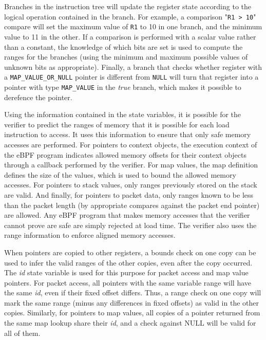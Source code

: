 \documentclass[10pt,sigconf]{acmart}
\begin{document}
Branches in the instruction tree will update the register state according to the
logical operation contained in the branch. For example, a comparison "\texttt{R1
  > 10}" compare will set the maximum value of \texttt{R1} to 10 in one branch,
and the minimum value to 11 in the other. If a comparison is performed with a
scalar value rather than a constant, the knowledge of which bits are set is used
to compute the ranges for the branches (using the minimum and maximum possible
values of unknown bits as appropriate). Finally, a branch that checks whether
register with a \texttt{MAP\_VALUE\_OR\_NULL} pointer is different from
\texttt{NULL} will turn that register into a pointer with type
\texttt{MAP\_VALUE} in the \emph{true} branch, which makes it possible to
derefence the pointer.

Using the information contained in the state variables, it is possible for the
verifier to predict the ranges of memory that it is possible for each load
instruction to access. It uses this information to ensure that only safe memory
accesses are performed. For pointers to context objects, the execution context
of the eBPF program indicates allowed memory offsets for their context objects
through a callback performed by the verifier. For map values, the map definition
defines the size of the values, which is used to bound the allowed memory
accesses. For pointers to stack values, only ranges previously stored on the
stack are valid. And finally, for pointers to packet data, only ranges known to
be less than the packet length (by appropriate compares against the packet end
pointer) are allowed. Any eBPF program that makes memory accesses that the
verifier cannot prove are safe are simply rejected at load time. The verifier
also uses the range information to enforce aligned memory accesses.

When pointers are copied to other registers, a bounds check on one copy can be
used to infer the valid ranges of the other copies, even after the copy
occurred. The \emph{id} state variable is used for this purpose for packet access and
map value pointers. For packet access, all pointers with the same variable
range will have the same \emph{id}, even if their fixed offset differs. Thus, a range
check on one copy will mark the same range (minus any differences in fixed
offsets) as valid in the other copies. Similarly, for pointers to map values,
all copies of a pointer returned from the same map lookup share their \emph{id}, and
a check against NULL will be valid for all of them.
\end{document}
